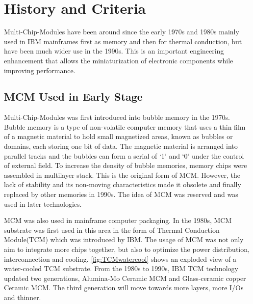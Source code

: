 
\chapter{History and Criteria}
\begin{spacing}{1.5}
\setlength{\parskip}{0.3in}

Multi-Chip-Modules have been around since the early 1970s and 1980s mainly used in IBM mainframes first as memory and then for thermal conduction, but have been much wider use in the 1990s. This is an important engineering enhancement that allows the miniaturization of electronic components while improving performance. 

\section{MCM Used in Early Stage}

Multi-Chip-Modules was first introduced into bubble memory in the 1970s. Bubble memory is a type of non-volatile computer memory that uses a thin film of a magnetic material to hold small magnetized areas, known as bubbles or domains, each storing one bit of data. The magnetic material is arranged into parallel tracks and the bubbles can form a serial of ‘1’ and ‘0’ under the control of external field. To increase the density of bubble memories, memory chips were assembled in multilayer stack. This is the original form of MCM. However, the lack of stability and its non-moving characteristics made it obsolete and finally replaced by other memories in 1990s. The idea of MCM was reserved and was used in later technologies.

MCM was also used in mainframe computer packaging. In the 1980s, MCM substrate was first used in this area in the form of Thermal Conduction Module(TCM) which was introduced by IBM. The usage of MCM was not only aim to integrate more chips together, but also to optimize the power distribution, interconnection and cooling. \autoref{fig:TCMwatercool} shows an exploded view of a water-cooled TCM substrate.\cite{Mainframe_Packaging_TCM} From the 1980s to 1990s, IBM TCM technology updated two generations, Alumina-Mo Ceramic MCM and Glass-ceramic copper Ceramic MCM. The third generation will move towards more layers, more I/Os and thinner.


\end{spacing}
